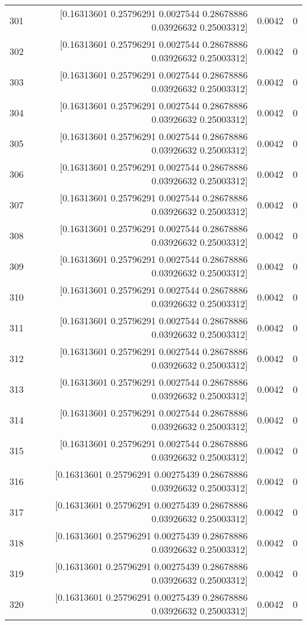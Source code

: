 \begin{longtable}{lrrr}
301 & [0.16313601 0.25796291 0.0027544  0.28678886 0.03926632 0.25003312] & 0.0042 & 0 \\
302 & [0.16313601 0.25796291 0.0027544  0.28678886 0.03926632 0.25003312] & 0.0042 & 0 \\
303 & [0.16313601 0.25796291 0.0027544  0.28678886 0.03926632 0.25003312] & 0.0042 & 0 \\
304 & [0.16313601 0.25796291 0.0027544  0.28678886 0.03926632 0.25003312] & 0.0042 & 0 \\
305 & [0.16313601 0.25796291 0.0027544  0.28678886 0.03926632 0.25003312] & 0.0042 & 0 \\
306 & [0.16313601 0.25796291 0.0027544  0.28678886 0.03926632 0.25003312] & 0.0042 & 0 \\
307 & [0.16313601 0.25796291 0.0027544  0.28678886 0.03926632 0.25003312] & 0.0042 & 0 \\
308 & [0.16313601 0.25796291 0.0027544  0.28678886 0.03926632 0.25003312] & 0.0042 & 0 \\
309 & [0.16313601 0.25796291 0.0027544  0.28678886 0.03926632 0.25003312] & 0.0042 & 0 \\
310 & [0.16313601 0.25796291 0.0027544  0.28678886 0.03926632 0.25003312] & 0.0042 & 0 \\
311 & [0.16313601 0.25796291 0.0027544  0.28678886 0.03926632 0.25003312] & 0.0042 & 0 \\
312 & [0.16313601 0.25796291 0.0027544  0.28678886 0.03926632 0.25003312] & 0.0042 & 0 \\
313 & [0.16313601 0.25796291 0.0027544  0.28678886 0.03926632 0.25003312] & 0.0042 & 0 \\
314 & [0.16313601 0.25796291 0.0027544  0.28678886 0.03926632 0.25003312] & 0.0042 & 0 \\
315 & [0.16313601 0.25796291 0.0027544  0.28678886 0.03926632 0.25003312] & 0.0042 & 0 \\
316 & [0.16313601 0.25796291 0.00275439 0.28678886 0.03926632 0.25003312] & 0.0042 & 0 \\
317 & [0.16313601 0.25796291 0.00275439 0.28678886 0.03926632 0.25003312] & 0.0042 & 0 \\
318 & [0.16313601 0.25796291 0.00275439 0.28678886 0.03926632 0.25003312] & 0.0042 & 0 \\
319 & [0.16313601 0.25796291 0.00275439 0.28678886 0.03926632 0.25003312] & 0.0042 & 0 \\
320 & [0.16313601 0.25796291 0.00275439 0.28678886 0.03926632 0.25003312] & 0.0042 & 0 \\

\end{longtable}
